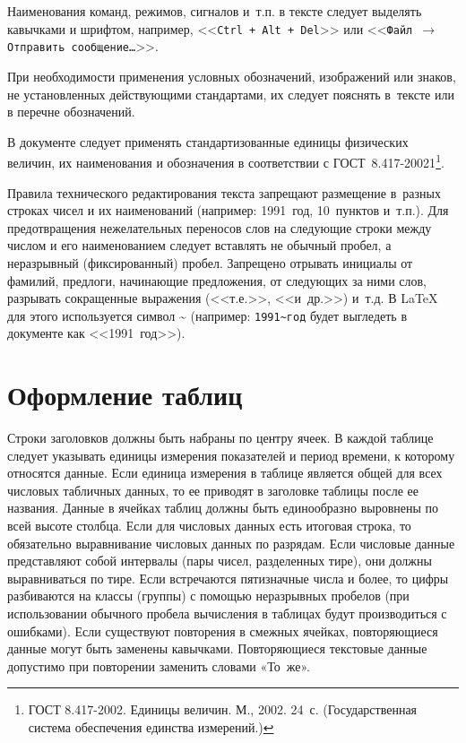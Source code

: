 \documentclass[PI,VKR]{HSEUniversityPractice}
\begin{document}
Наименования команд, режимов, сигналов и т.п. в тексте следует выделять кавычками и шрифтом, например, <<\texttt{Ctrl + Alt + Del}>> или <<\texttt{Файл $\rightarrow$ Отправить сообщение\dots}>>.

При необходимости применения условных обозначений, изображений или знаков, не установленных действующими стандартами, их следует пояснять в тексте или в перечне обозначений.

В документе следует применять стандартизованные единицы физических величин, их наименования и обозначения в соответствии с ГОСТ 8.417-20021\footnote{ГОСТ 8.417-2002. Единицы величин. М., 2002. 24 с. (Государственная система обеспечения единства измерений.)}.

Правила технического редактирования текста запрещают размещение в разных строках чисел и их наименований (например: 1991~год, 10~пунктов и т.п.). Для предотвращения нежелательных переносов слов на следующие строки между числом и его наименованием следует вставлять не обычный пробел, а неразрывный (фиксированный) пробел. Запрещено отрывать инициалы от фамилий, предлоги, начинающие предложения, от следующих за ними слов, разрывать сокращенные выражения (<<т.е.>>, <<и др.>>) и т.д. В \LaTeX{} для этого используется символ \textasciitilde{} (например: \texttt{1991\textasciitilde{}год} будет выгледеть в документе как <<1991~год>>).

\section{Оформление таблиц} 
%
Строки заголовков должны быть набраны по центру ячеек. В каждой таблице следует указывать единицы измерения показателей и период времени, к которому относятся данные. Если единица измерения в таблице является общей для всех числовых табличных данных, то ее приводят в заголовке таблицы после ее названия.
Данные в ячейках таблиц должны быть единообразно выровнены по всей высоте столбца. Если для числовых данных есть итоговая строка, то обязательно выравнивание числовых данных по разрядам. Если числовые данные представляют собой интервалы (пары чисел, разделенных тире), они должны выравниваться по тире. Если встречаются пятизначные числа и более, то цифры разбиваются на классы (группы) с помощью неразрывных пробелов (при использовании обычного пробела вычисления в таблицах будут производиться с ошибками). Если существуют повторения в смежных ячейках, повторяющиеся данные могут быть заменены кавычками. Повторяющиеся текстовые данные допустимо при повторении заменить словами «То же».
\end{document}
